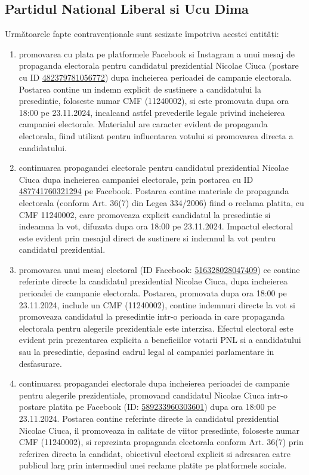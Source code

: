 \documentclass[a4paper,12pt]{article}
\begin{document}
\vspace{0.5cm}

\subsection{Partidul National Liberal si Ucu Dima}
Următoarele fapte contravenționale sunt sesizate împotriva acestei entități:

\begin{enumerate}[leftmargin=*, label=\arabic*.)]
    \item promovarea cu plata pe platformele Facebook si Instagram a unui mesaj de propaganda electorala pentru candidatul prezidential Nicolae Ciuca (postare cu ID \href{https://www.facebook.com/ads/library/?id=482379781056772}{482379781056772}) dupa incheierea perioadei de campanie electorala. Postarea contine un indemn explicit de sustinere a candidatului la presedintie, foloseste numar CMF (11240002), si este promovata dupa ora 18:00 pe 23.11.2024, incalcand astfel prevederile legale privind incheierea campaniei electorale. Materialul are caracter evident de propaganda electorala, fiind utilizat pentru influentarea votului si promovarea directa a candidatului.
    \item continuarea propagandei electorale pentru candidatul prezidential Nicolae Ciuca dupa incheierea campaniei electorale, prin postarea cu ID \href{https://www.facebook.com/ads/library/?id=487741760321294}{487741760321294} pe Facebook. Postarea contine materiale de propaganda electorala (conform Art. 36(7) din Legea 334/2006) fiind o reclama platita, cu CMF 11240002, care promoveaza explicit candidatul la presedintie si indeamna la vot, difuzata dupa ora 18:00 pe 23.11.2024. Impactul electoral este evident prin mesajul direct de sustinere si indemnul la vot pentru candidatul prezidential.
    \item promovarea unui mesaj electoral (ID Facebook: \href{https://www.facebook.com/ads/library/?id=516328028047409}{516328028047409}) ce contine referinte directe la candidatul prezidential Nicolae Ciuca, dupa incheierea perioadei de campanie electorala. Postarea, promovata dupa ora 18:00 pe 23.11.2024, include un CMF (11240002), contine indemnuri directe la vot si promoveaza candidatul la presedintie intr-o perioada in care propaganda electorala pentru alegerile prezidentiale este interzisa. Efectul electoral este evident prin prezentarea explicita a beneficiilor votarii PNL si a candidatului sau la presedintie, depasind cadrul legal al campaniei parlamentare in desfasurare.
    \item continuarea propagandei electorale dupa incheierea perioadei de campanie pentru alegerile prezidentiale, promovand candidatul Nicolae Ciuca intr-o postare platita pe Facebook (ID: \href{https://www.facebook.com/ads/library/?id=589233960303601}{589233960303601}) dupa ora 18:00 pe 23.11.2024. Postarea contine referinte directe la candidatul prezidential Nicolae Ciuca, il promoveaza in calitate de viitor presedinte, foloseste numar CMF (11240002), si reprezinta propaganda electorala conform Art. 36(7) prin referirea directa la candidat, obiectivul electoral explicit si adresarea catre publicul larg prin intermediul unei reclame platite pe platformele sociale.

\end{enumerate}
\end{document}
